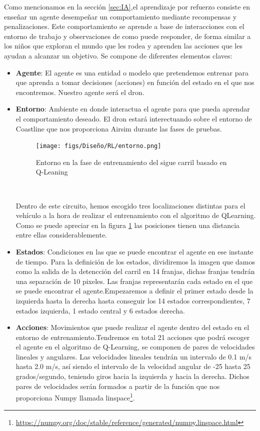   Como mencionamos en la sección \ref{sec:IA},el aprendizaje por refuerzo consiste en enseñar un agente 
  desempeñar un comportamiento mediante recompensas y penalizaciones. Este comportamiento se aprende a base de interacciones con el entorno de trabajo y observaciones de como puede responder,
  de forma similar a los niños que exploran el mundo que les rodea y aprenden las acciones que les ayudan a alcanzar un objetivo. Se compone de diferentes elementos claves:
  \begin{itemize} 
    \item \textbf{Agente}: El agente es una entidad o modelo que pretendemos entrenar para que aprenda a tomar decisiones (acciones) en función del estado en el que nos encontremos. Nuestro 
    agente será el dron.
    \item \textbf{Entorno}: Ambiente en donde interactua el agente para que pueda aprendar el comportamiento deseado. El dron estará interectuando sobre el entorno de Coastline que nos proporciona Airsim 
    durante las fases de pruebas. 
    \begin{figure} [H]
      \begin{center}
        \texttt{[image: figs/Diseño/RL/entorno.png]}
      \end{center}
      \caption{Entorno en la fase de entrenamiento del sigue carril basado en Q-Leaning}
      \label{fig:Entorno}
    \end{figure}\

    Dentro de este circuito, hemos escogido tres localizaciones distintas para el vehículo a la hora de realizar el entrenamiento con el algoritmo de QLearning. Como se puede apreciar en la figura \ref{fig:Entorno} las posiciones
    tienen una distancia entre ellas considerablemente. 
    \item \textbf{Estados}: Condiciones en las que se puede encontrar el agente en ese instante de tiempo. Para la definición de los estados, dividiremos la imagen que damos como la salida de la detencción del carril en 14 franjas, dichas franjas tendrán una 
    separación de 10 pixeles. Las franjas representarán cada estado en el que se puede encontrar el agente.Empezaremos a definir el primer estado desde la izquierda hasta la derecha
    hasta conseguir los 14 estados correspondientes, 7 estados izquierda, 1 estado central y 6 estados derecha. 
    \item \textbf{Acciones}: Movimientos que puede realizar el agente dentro del estado en el entorno de entrenamiento.Tendremos en total 21 acciones que podrá escoger el agente en el algoritmo de Q-Learning, se componen de pares de velocidades lineales y angulares. Las velocidades lineales
    tendrán un intervalo de 0.1 m/s hasta 2.0 m/s, así siendo el intervalo de la velocidad angular de -25 hasta 25 grados/segundo, teniendo giros hacia la izquierda y hacia la derecha. Dichos pares
    de velocidades serán formados a partir de la función que nos proporciona Numpy llamada linspace\footnote{\url{https://numpy.org/doc/stable/reference/generated/numpy.linspace.html}}. \newline
  

\end{itemize}
